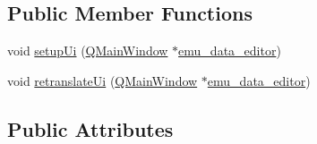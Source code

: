 \subsection*{Public Member Functions}
\begin{DoxyCompactItemize}
\item 
void \hyperlink{a00079_a33af8ac054888d9cc0833b699028b690}{setup\+Ui} (\hyperlink{a00058}{Q\+Main\+Window} $\ast$\hyperlink{a00008}{emu\+\_\+data\+\_\+editor})
\item 
void \hyperlink{a00079_a4118bb421fd84731231aa1429fedf5f8}{retranslate\+Ui} (\hyperlink{a00058}{Q\+Main\+Window} $\ast$\hyperlink{a00008}{emu\+\_\+data\+\_\+editor})
\end{DoxyCompactItemize}
\subsection*{Public Attributes}
